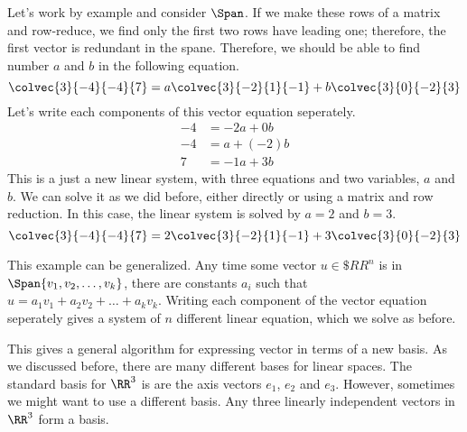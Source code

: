 \documentclass[fleqn]{report}
\begin{document}
\begin{example}
Let's work by example and consider
$\Span$. If we
make these rows of a matrix and row-reduce, we find only the
first two rows have leading one; therefore, the first vector
is redundant in the spane. Therefore, we should be able to
find number $a$ and $b$ in the following equation.
\begin{equation*}
\colvec{3}{-4}{-4}{7} = a \colvec{3}{-2}{1}{-1} + b
\colvec{3}{0}{-2}{3}
\end{equation*}
Let's write each components of this vector equation
seperately.
\begin{align*}
-4 & = -2a + 0b \\
-4 & = a + (-2)b \\
7 & = -1a + 3b 
\end{align*}
This is a just a new linear system, with three equations and
two variables, $a$ and $b$. We can solve it as we did before,
either directly or using a matrix and row reduction. In this
case, the linear system is solved by $a = 2$ and $b=3$. 
\begin{equation*}
\colvec{3}{-4}{-4}{7} = 2 \colvec{3}{-2}{1}{-1} + 3
\colvec{3}{0}{-2}{3}
\end{equation*}
\end{example}

This example can be generalized. Any time some vector $u \in
\$RR^n$ is in $\Span\{v_1, v_2, \ldots, v_k\}$, there are
constants $a_i$ such that $u = a_1v_1 + a_2v_2 + \ldots +
a_kv_k$. Writing each component of the vector equation
seperately gives a system of $n$ different linear equation,
which we solve as before.

This gives a general algorithm for expressing vector in terms
of a new basis. As we discussed before, there are many
different bases for linear spaces. The standard basis for
$\RR^3$ is are the axis vectors $e_1$, $e_2$ and $e_3$.
However, sometimes we might want to use a different basis. Any
three linearly independent vectors in $\RR^3$ form a basis. 
\end{document}

